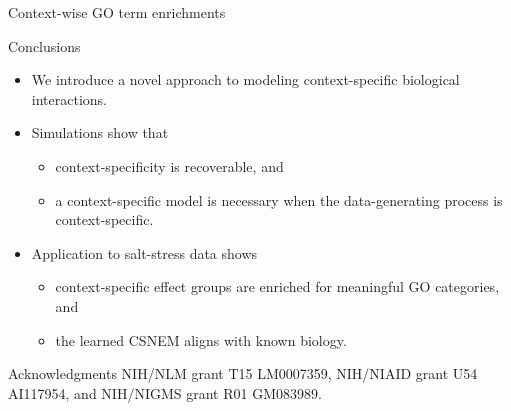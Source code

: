 \documentclass[aspectratio=169]{beamer}
\begin{document}
\begin{frame}{Context-wise GO term enrichments}
\end{frame}


\begin{frame}{Conclusions}
 \begin{itemize}
  \item We introduce a novel approach to modeling context-specific biological interactions.
  \pause
  \item Simulations show that
  \begin{itemize}
   \item context-specificity is recoverable, and
   \item a context-specific model is necessary when the data-generating process is context-specific.
  \end{itemize}
  \item Application to salt-stress data shows
  \begin{itemize}
   \item context-specific effect groups are enriched for meaningful GO categories, and
   \item the learned CSNEM aligns with known biology.
  \end{itemize}
 \end{itemize}
 \pause
 \begin{block}{Acknowledgments}
   \scriptsize
   \color{UWRed}
   NIH/NLM grant T15 LM0007359, NIH/NIAID grant U54 AI117954, and NIH/NIGMS grant R01 GM083989.
 \end{block}
\end{frame}
\end{document}
